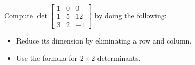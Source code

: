 \begin{applicationActivities}
%
%
%
%


\begin{activity}{5}
  Compute  $\det \begin{bmatrix} 1 & 0 & 0 \\ 1 & 5 & 12 \\ 3 & 2 & -1 \end{bmatrix}$
  by doing the following:
  \begin{itemize}
  \item Reduce its dimension by eliminating a row and column.
  \item Use the formula for \(2\times 2\) determinants.
  \end{itemize}
\end{activity}


\end{applicationActivities}
